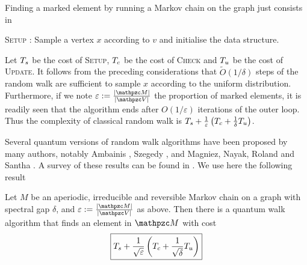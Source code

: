 Finding a marked element by running a Markov chain on the graph just consists in 

 \begin{algorithm}[H]
  \DontPrintSemicolon
   \textsc{Setup :} Sample a vertex $x$ according to $v$ and initialise the data structure.\;

  \caption{$RandomWalk$}
 \end{algorithm}

Let $T_s$ be the cost of \textsc{Setup}, $T_c$ be the cost of \textsc{Check} and $T_u$ be the cost of \textsc{Update}. 
It follows from the preceding considerations that $\tilde O(1/\delta)$ steps of the random walk are sufficient to sample $x$ according to the uniform distribution.
Furthermore, if we note $\varepsilon := \frac{|\zM|}{|\zV|}$ the proportion of marked elements, it is readily seen that the algorithm ends after $O(1/\varepsilon)$ iterations of the outer loop.
Thus the complexity of classical random walk is $T_s + \frac{1}{\varepsilon}\left(T_c + \frac{1}{\delta}T_u\right)$.

Several quantum versions of random walk algorithms have been proposed by many authors, notably Ambainis \cite{A07}, Szegedy \cite{S04}, and Magniez, Nayak, Roland and Santha \cite{MNRS07}. A survey of these results can be found in \cite{S08}. We use here the following result
\begin{theorem}
\label{th:quantumwalk}
Let $M$ be an aperiodic, irreducible and reversible Markov chain on a graph with spectral gap $\delta$, and $\varepsilon := \frac{|\zM|}{|\zV|}$ as above. Then there is a quantum walk algorithm that finds an element in $\zM$ with cost
\begin{equation}\label{eq:complexity_quantum_walk}
\boxed{T_s + \frac{1}{\sqrt\varepsilon}\left(T_c + \frac{1}{\sqrt\delta}T_u\right)}
\end{equation}
\end{theorem}


